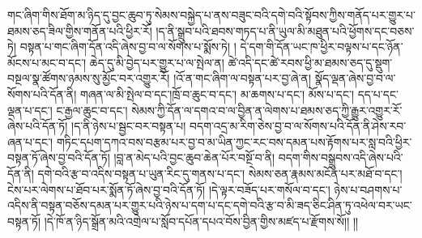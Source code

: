གང་ཞིག་གིས་ཐོག་མ་ཉིད་དུ་བྱང་ཆུབ་ཏུ་སེམས་བསྐྱེད་པ་ནས་བཟུང་བའི་དགེ་བའི་སྟོབས་ཀྱིས་གནོད་པར་གྱུར་པ་ཐམས་ཅད་ཟིལ་གྱིས་གནོན་པའི་ཕྱིར་རོ། །ད་ནི་སྒྲུབ་པའི་ཐབས་གཏད་པ་ནི་ཡུལ་མི་མཐུན་པའི་ཕྱོགས་དང་བཅས་ཏེ། བསྟན་པ་གང་ཞིག་དོན་འདི་ཞེས་བྱ་བ་ལ་སོགས་པ་སྨོས་ཏེ། །
དེ་དག་གི་དོན་ཡང་ཁ་ཕྱིར་བལྟས་པ་དང་ཉོན་མོངས་པ་མང་བ་དང་། ཆེད་དུ་མི་བྱེད་པར་གྱུར་པ་ལ་སྤེལ་ན། ཚེ་འདི་དང་ཚེ་རབས་ཕྱི་མ་ཐམས་ཅད་དུ་སྡུག་བསྔལ་སྣ་ཚོགས་ཉམས་སུ་མྱོང་བར་འགྱུར་རོ། །འོ་ན་གང་ཞིག་ལ་བསྟན་པར་བྱ་ཞེ་ན། སྣོད་ལྡན་ཞེས་བྱ་བ་ལ་སོགས་པའི་དོན་ནི། གཞན་ལ་མི་སྤེལ་བ་དང་།ཁྲོ་བ་ཆུང་བ་དང་། མ་ཆགས་པ་དང་། མོས་པ་དང་། དད་པ་དང་ལྡན་པ་དང་། ང་རྒྱལ་ཆུང་བ་དང་། སེམས་ཀྱི་དོན་ལ་དགའ་བ་ལ་བྱིན་ན་ལེགས་པ་ཐམས་ཅད་ཀྱི་རྒྱུར་འགྱུར་རོ་ཞེས་པའི་དོན་ཏོ། །ད་ནི་ཉེས་པ་སྦྱང་བར་བསྟན་པ། བདག་འདྲ་མ་རིག་ཅེས་བྱ་བ་ལ་སོགས་པའི་དོན་ནི་ཤེས་རབ་ཞན་པ་དང་། གཏིང་དཔག་དཀའ་བས་བརྩམ་པར་བྱ་བ་མ་ཡིན་ཀྱང་རང་བས་དམན་པས་རྟོགས་པར་སླ་བའི་ཕྱིར་བསྟན་ཏོ་ཞེས་བྱ་བའི་དོན་ཏོ། །བླ་ན་མེད་པའི་བྱང་ཆུབ་ཆེན་པོར་བསྔོ་བ་ནི། བདག་གིས་བསྒྲུབས་འདི་ཞེས་པའི་དོན་ནི། དགེ་བའི་རྩ་བ་འདིས་བསྟན་པ་ཡུན་རིང་དུ་གནས་པ་དང་། སེམས་ཅན་རྣམས་མངོན་པར་མཐོ་བ་དང་། ངེས་པར་ལེགས་པ་ཐོབ་པར་སྨོན་ཏོ་ཞེས་བྱ་བའི་དོན་ཏོ། །དེ་ལྟར་བཟོད་པར་གསོལ་བ་དང་། ཉེས་པ་བཤགས་པ་འདིས་ནི་བསྟན་བཅོས་དམན་པར་གྱུར་པའི་ཉེས་པ་དག་པ་དང་དགེ་བའི་རྩ་བ་མི་ཟད་ཅིང་ཤིན་ཏུ་འཕེལ་བར་ཡང་བསྟན་ཏོ། །དེ་ཁོ་ན་ཉིད་སྒྲོན་མའི་འགྲེལ་པ་སློབ་དཔོན་དཔའ་བོས་བྱིན་གྱིས་མཛད་པ་རྫོགས་སོ།། །།